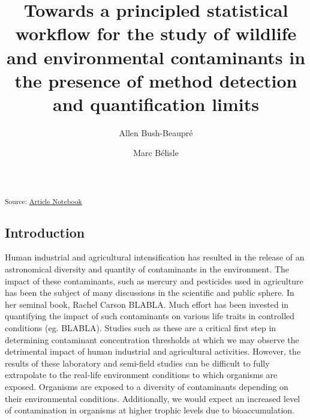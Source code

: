\documentclass[
]{article}
\title{Towards a principled statistical workflow for the study of
wildlife and environmental contaminants in the presence of method
detection and quantification limits}
\author{Allen Bush-Beaupré \and Marc Bélisle}
\date{}
\begin{document}
\maketitle

\textsubscript{Source:
\href{https://abushbeaupre.github.io/quantifying_pesticides/index.qmd.html}{Article
Notebook}}

\subsection{Introduction}\label{introduction}

Human industrial and agricultural intensification has resulted in the
release of an astronomical diversity and quantity of contaminants in the
environment. The impact of these contaminants, such as mercury and
pesticides used in agriculture has been the subject of many discussions
in the scientific and public sphere. In her seminal book, Rachel Carson
BLABLA. Much effort has been invested in quantifying the impact of such
contaminants on various life traits in controlled conditions (eg.
BLABLA). Studies such as these are a critical first step in determining
contaminant concentration thresholds at which we may observe the
detrimental impact of human industrial and agricultural activities.
However, the results of these laboratory and semi-field studies can be
difficult to fully extrapolate to the real-life environment conditions
to which organisms are exposed. Organisms are exposed to a diversity of
contaminants depending on their environmental conditions. Additionally,
we would expect an increased level of contamination in organisms at
higher trophic levels due to bioaccumulation.
\end{document}
